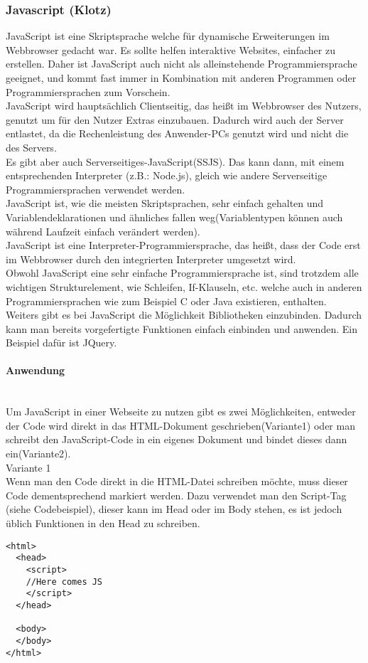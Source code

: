 \subsubsection{Javascript (Klotz)}
\label{sec:content_js_Javascript}
JavaScript ist eine Skriptsprache welche für dynamische Erweiterungen im Webbrowser gedacht war. Es sollte helfen interaktive Websites, einfacher zu erstellen. Daher ist JavaScript auch nicht als alleinstehende Programmiersprache geeignet, und kommt fast immer in Kombination mit anderen Programmen oder Programmiersprachen zum Vorschein.\\
JavaScript wird hauptsächlich Clientseitig, das heißt im Webbrowser des Nutzers, genutzt um für den Nutzer Extras einzubauen. Dadurch wird auch der Server entlastet, da die Rechenleistung des Anwender-PCs genutzt wird und nicht die des Servers.\\
 Es gibt aber auch Serverseitiges-JavaScript(SSJS). Das kann dann, mit einem entsprechenden Interpreter (z.B.: Node.js), gleich wie andere Serverseitige Programmiersprachen verwendet werden.\\
JavaScript ist, wie die meisten Skriptsprachen, sehr einfach gehalten und Variablendeklarationen und ähnliches fallen weg(Variablentypen können auch während Laufzeit einfach verändert werden).\\
JavaScript ist eine Interpreter-Programmiersprache, das heißt, dass der Code erst im Webbrowser durch den integrierten Interpreter umgesetzt wird.\\
Obwohl JavaScript eine sehr einfache Programmiersprache ist, sind trotzdem alle wichtigen Strukturelement, wie Schleifen, If-Klauseln, etc. welche auch in anderen Programmiersprachen wie zum Beispiel C oder Java existieren, enthalten.\\
Weiters gibt es bei JavaScript die Möglichkeit Bibliotheken einzubinden. Dadurch kann man bereits vorgefertigte Funktionen einfach einbinden und anwenden. Ein Beispiel dafür ist JQuery.\\

\paragraph{Anwendung}\\
Um JavaScript in einer Webseite zu nutzen gibt es zwei Möglichkeiten, entweder der Code wird direkt in das HTML-Dokument geschrieben(Variante1) oder man schreibt den JavaScript-Code in ein eigenes Dokument und bindet dieses dann ein(Variante2).\\
Variante 1\\
Wenn man den Code direkt in die HTML-Datei schreiben möchte, muss dieser Code dementsprechend markiert werden. Dazu verwendet man den Script-Tag (siehe Codebeispiel), dieser kann im Head oder im Body stehen, es ist jedoch üblich Funktionen in den Head zu schreiben.\\
\begin{lstlisting}
<html>
  <head>
    <script>
	//Here comes JS
    </script> 
  </head>
  
  <body>
  </body>
</html>
\end{lstlisting}


